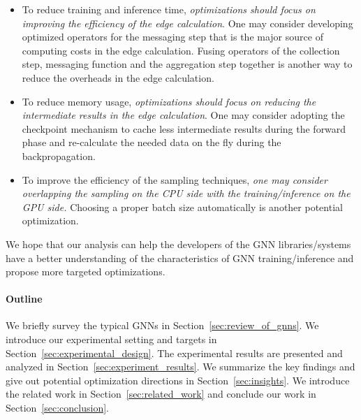 \begin{itemize}
      \item To reduce training and inference time, \emph{optimizations should focus on improving the efficiency of the edge calculation}.
      One may consider developing optimized operators for the messaging step that is the major source of computing costs in the edge calculation.
       Fusing operators of the collection step, messaging function and the aggregation step together is another way to reduce the overheads in the edge calculation.
       
      \item To reduce memory usage, \emph{optimizations should focus on reducing the intermediate results in the edge calculation}.
      One may consider adopting the checkpoint mechanism to cache less intermediate results during the forward phase and re-calculate the needed data on the fly during the backpropagation.
      \item To improve the efficiency of the sampling techniques, \emph{one may consider overlapping the sampling on the CPU side with the training/inference on the GPU side.}
      Choosing a proper batch size automatically is another potential optimization.
\end{itemize}

We hope that our analysis can help the developers of the GNN libraries/systems have a better understanding of the characteristics of GNN training/inference and propose more targeted optimizations.

\paragraph{Outline}
We briefly survey the typical GNNs in Section~\ref{sec:review_of_gnns}.
%
We introduce our experimental setting and targets in Section~\ref{sec:experimental_design}.
%
The experimental results are presented and analyzed in Section~\ref{sec:experiment_results}.
%
We summarize the key findings and give out potential optimization directions in Section~\ref{sec:insights}.
%
We introduce the related work in Section~\ref{sec:related_work} and conclude our work in Section~\ref{sec:conclusion}.

